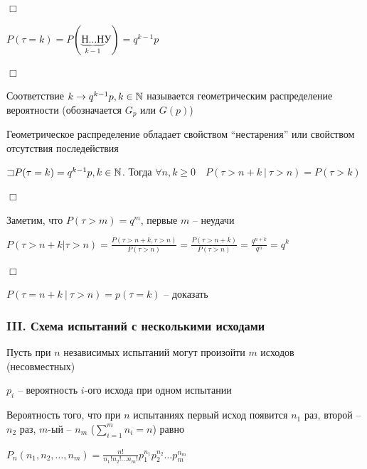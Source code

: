 \documentclass[12pt]{article}
\begin{document}
    \begin{MyProof}
        $\Box$

        $P(\tau = k) = P(\underset{k - 1}{\underbrace{\text{Н}\dots\text{Н}}}\text{У}) = q^{k - 1}p$

        $\Box$
    \end{MyProof}

    \hypertarget{geometricdistribution}{}

    \Def Соответствие $k \rightarrow q^{k - 1} p, k \in \mathbb{N}$ называется геометрическим
    распределение вероятности (обозначается $G_p$ или $G(p)$)

    \Nota Геометрическое распределение обладает свойством \enquote{нестарения} или свойством отсутствия
    последействия

    \begin{MyTheorem}
        \Ths $\mathord{\sqsupset} P(\tau = k) = q^{k - 1} p, k \in \mathbb{N}$. Тогда $\forall n, k \geq 0 \quad P(\tau > n + k \ | \ \tau > n) = P(\tau > k)$
    \end{MyTheorem}

    \begin{MyProof}
        $\Box$

        Заметим, что $P(\tau > m) = q^m$, первые $m$ -- неудачи

        $P(\tau > n + k | \tau > n) = \frac{P(\tau > n + k, \tau > n)}{P(\tau > n)} = \frac{P(\tau > n + k)}{P(\tau > n)} = \frac{q^{n + k}}{q^n} = q^k$

        $\Box$
    \end{MyProof}

    \Nota $P(\tau = n + k \ | \ \tau > n) = p(\tau = k)$ -- \Lab доказать

    \subsubsection{III. Схема испытаний с несколькими исходами}

    Пусть при $n$ независимых испытаний могут произойти $m$ исходов (несовместных)

    $p_i$ -- вероятность $i$-ого исхода при одном испытании

    \begin{MyTheorem}
        \Ths Вероятность того, что при $n$ испытаниях первый исход появится $n_1$ раз, второй -- $n_2$ раз, $m$-ый -- $n_m$ ($\sum_{i = 1}^m n_i = n$)
        равно

        $P_n(n_1, n_2, \dots, n_m) = \frac{n!}{n_1! n_2! \dots n_m!} p_1^{n_1} p_2^{n_2} \dots p_m^{n_m}$
    \end{MyTheorem}
\end{document}
